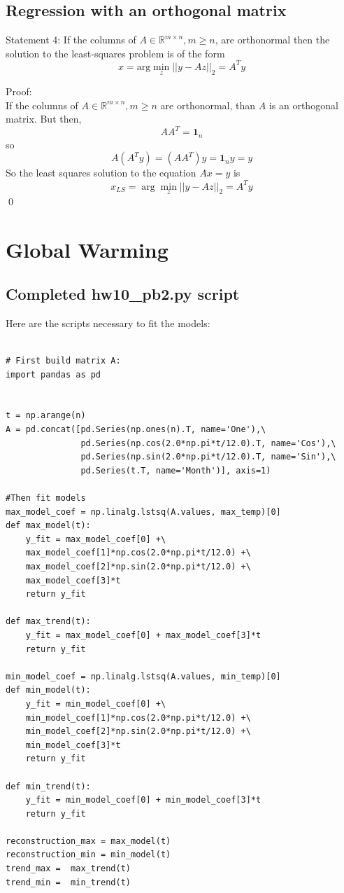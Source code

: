 \documentclass[paper=a4, fontsize=11pt]{scrartcl} %
\numberwithin{equation}{section} %
\numberwithin{figure}{section} %
\numberwithin{table}{section} %
\begin{document}
\subsection{Regression with an orthogonal matrix }

Statement 4: If the columns of $A \in \mathbb{R}^{m \times n}, m \geq n$, are orthonormal then the solution to the least-squares problem is of the form
\[x = \mathrm{arg} \min_z ||y - Az||_2 = A^T y\]

Proof: \\

If the columns of $A \in \mathbb{R}^{m \times n}, m \geq n$ are orthonormal, than $A$ is an orthogonal matrix. But then,
\[ A A^T = \mathbf{1}_n\]
so
\[A (A^Ty) = (AA^T)y = \mathbf{1}_n y = y\]
So the least squares solution to the equation $Ax = y$ is
\[x_{LS} = \arg \min_z ||y - Az||_2 = A^Ty\] \qed


\section{Global Warming}

\subsection{Completed hw10\_pb2.py script}

Here are the scripts necessary to  fit the models:\\

\begin{lstlisting}[frame=single, basicstyle=\small]

# First build matrix A:
import pandas as pd


t = np.arange(n)
A = pd.concat([pd.Series(np.ones(n).T, name='One'),\
               pd.Series(np.cos(2.0*np.pi*t/12.0).T, name='Cos'),\
               pd.Series(np.sin(2.0*np.pi*t/12.0).T, name='Sin'),\
               pd.Series(t.T, name='Month')], axis=1)
               
#Then fit models
max_model_coef = np.linalg.lstsq(A.values, max_temp)[0]
def max_model(t):
    y_fit = max_model_coef[0] +\
    max_model_coef[1]*np.cos(2.0*np.pi*t/12.0) +\
    max_model_coef[2]*np.sin(2.0*np.pi*t/12.0) +\
    max_model_coef[3]*t
    return y_fit

def max_trend(t):
    y_fit = max_model_coef[0] + max_model_coef[3]*t
    return y_fit

min_model_coef = np.linalg.lstsq(A.values, min_temp)[0]
def min_model(t):
    y_fit = min_model_coef[0] +\
    min_model_coef[1]*np.cos(2.0*np.pi*t/12.0) +\
    min_model_coef[2]*np.sin(2.0*np.pi*t/12.0) +\
    min_model_coef[3]*t
    return y_fit

def min_trend(t):
    y_fit = min_model_coef[0] + min_model_coef[3]*t
    return y_fit

reconstruction_max = max_model(t)
reconstruction_min = min_model(t)
trend_max =  max_trend(t)
trend_min =  min_trend(t)
\end{lstlisting}
\end{document}

